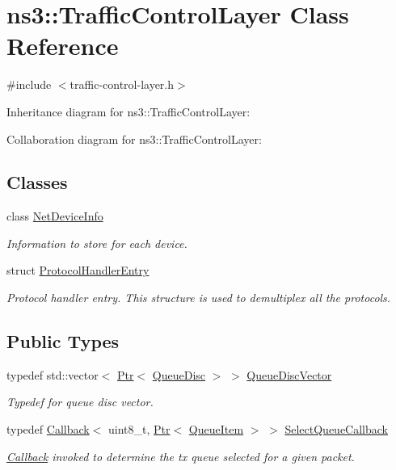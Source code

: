 \hypertarget{classns3_1_1TrafficControlLayer}{}\section{ns3\+:\+:Traffic\+Control\+Layer Class Reference}
\label{classns3_1_1TrafficControlLayer}


{\ttfamily \#include $<$traffic-\/control-\/layer.\+h$>$}



Inheritance diagram for ns3\+:\+:Traffic\+Control\+Layer\+:


Collaboration diagram for ns3\+:\+:Traffic\+Control\+Layer\+:
\subsection*{Classes}
\begin{DoxyCompactItemize}
\item 
class \hyperlink{classns3_1_1TrafficControlLayer_1_1NetDeviceInfo}{Net\+Device\+Info}
\begin{DoxyCompactList}\small\item\em Information to store for each device. \end{DoxyCompactList}\item 
struct \hyperlink{structns3_1_1TrafficControlLayer_1_1ProtocolHandlerEntry}{Protocol\+Handler\+Entry}
\begin{DoxyCompactList}\small\item\em Protocol handler entry. This structure is used to demultiplex all the protocols. \end{DoxyCompactList}\end{DoxyCompactItemize}
\subsection*{Public Types}
\begin{DoxyCompactItemize}
\item 
typedef std\+::vector$<$ \hyperlink{classns3_1_1Ptr}{Ptr}$<$ \hyperlink{classns3_1_1QueueDisc}{Queue\+Disc} $>$ $>$ \hyperlink{classns3_1_1TrafficControlLayer_a9c468db4727d64733d7dba66d2791edf}{Queue\+Disc\+Vector}
\begin{DoxyCompactList}\small\item\em Typedef for queue disc vector. \end{DoxyCompactList}\item 
typedef \hyperlink{classns3_1_1Callback}{Callback}$<$ uint8\+\_\+t, \hyperlink{classns3_1_1Ptr}{Ptr}$<$ \hyperlink{classns3_1_1QueueItem}{Queue\+Item} $>$ $>$ \hyperlink{classns3_1_1TrafficControlLayer_aac192f903f140af92ca59a2d91a4c0cb}{Select\+Queue\+Callback}
\begin{DoxyCompactList}\small\item\em \hyperlink{classns3_1_1Callback}{Callback} invoked to determine the tx queue selected for a given packet. \end{DoxyCompactList}\end{DoxyCompactItemize}
